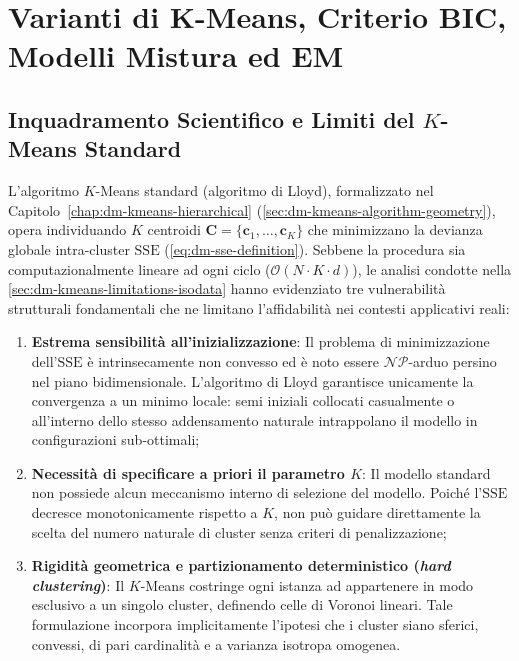 \chapter{Varianti di K-Means, Criterio BIC, Modelli Mistura ed EM}
\label{chap:dm-kmeans-variants-bic-em}

\FloatBarrier
\section{Inquadramento Scientifico e Limiti del \texorpdfstring{$K$}{K}-Means Standard}
\label{sec:dm-kmeans-limits}

L'algoritmo $K$-Means standard (algoritmo di Lloyd), formalizzato nel Capitolo~\ref{chap:dm-kmeans-hierarchical} (\autoref{sec:dm-kmeans-algorithm-geometry}), opera individuando $K$ centroidi $\mathbf{C} = \{\mathbf{c}_1, \dots, \mathbf{c}_K\}$ che minimizzano la devianza globale intra-cluster $\mathrm{SSE}$ (\autoref{eq:dm-sse-definition}). Sebbene la procedura sia computazionalmente lineare ad ogni ciclo ($\mathcal{O}(N \cdot K \cdot d)$), le analisi condotte nella \autoref{sec:dm-kmeans-limitations-isodata} hanno evidenziato tre vulnerabilità strutturali fondamentali che ne limitano l'affidabilità nei contesti applicativi reali:

\begin{enumerate}
    \item \textbf{Estrema sensibilità all'inizializzazione}: Il problema di minimizzazione dell'$\mathrm{SSE}$ è intrinsecamente non convesso ed è noto essere $\mathcal{NP}$-arduo persino nel piano bidimensionale. L'algoritmo di Lloyd garantisce unicamente la convergenza a un minimo locale: semi iniziali collocati casualmente o all'interno dello stesso addensamento naturale intrappolano il modello in configurazioni sub-ottimali;
    \item \textbf{Necessità di specificare a priori il parametro $K$}: Il modello standard non possiede alcun meccanismo interno di selezione del modello. Poiché l'$\mathrm{SSE}$ decresce monotonicamente rispetto a $K$, non può guidare direttamente la scelta del numero naturale di cluster senza criteri di penalizzazione;
    \item \textbf{Rigidità geometrica e partizionamento deterministico (\textit{hard clustering})}: Il $K$-Means costringe ogni istanza ad appartenere in modo esclusivo a un singolo cluster, definendo celle di Voronoi lineari. Tale formulazione incorpora implicitamente l'ipotesi che i cluster siano sferici, convessi, di pari cardinalità e a varianza isotropa omogenea.
\end{enumerate}

